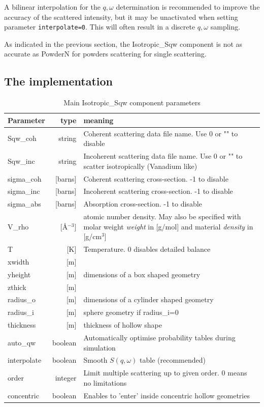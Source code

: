 A bilinear interpolation for the $q,\omega$ determination is recommended to improve the accuracy of the scattered intensity, but it may be unactivated when setting parameter \verb+interpolate=0+. This will often result in a discrete $q,\omega$ sampling.

As indicated in the previous section, the Isotropic\_Sqw component is not as accurate as PowderN for powders scattering for single scattering.

\subsection{The implementation}

\begin{table}
  \begin{center}
  {\let\my=\\
    \begin{tabular}{|lr|p{}|}
    \hline
Parameter & type & meaning \\
    \hline
Sqw\_coh   & string              & Coherent scattering data file name. Use 0 or "" to disable  \\
Sqw\_inc   & string              & Incoherent scattering data file name. Use 0 or "" to scatter isotropically (Vanadium like)  \\
sigma\_coh & [barns]      & Coherent scattering cross-section. -1 to disable \\
sigma\_inc & [barns]      & Incoherent scattering cross-section. -1 to disable \\
sigma\_abs & [barns]      & Absorption cross-section. -1 to disable  \\
V\_rho     & [\AA$^{-3}$] & atomic number density. May also be specified with molar weight \emph{weight} in [g/mol] and material \emph{density} in [g/cm$^3$] \\
T          & [K]          & Temperature. 0 disables detailed balance \\
    \hline
xwidth   & [m] & \\
yheight  & [m] & dimensions of a box shaped geometry \\
zthick   & [m] & \\
radius\_o & [m] & dimensions of a cylinder shaped geometry  \\
radius\_i & [m] & sphere geometry if radius\_i=0  \\
thickness& [m] & thickness of hollow shape  \\
    \hline
auto\_qw  & boolean & Automatically optimise probability tables during simulation  \\
interpolate & boolean & Smooth $S(q,\omega)$ table (recommended) \\
order     & integer & Limit multiple scattering up to given order. 0 means no limitations  \\
concentric& boolean & Enables to 'enter' inside concentric hollow geometries  \\
    \hline
    \end{tabular}
    \caption{Main Isotropic\_Sqw component parameters}
    \label{t:sqw-param}
  }
  \end{center}
\end{table}

